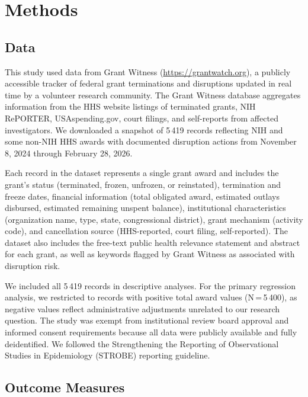 \documentclass[10pt, letterpaper]{article}
\begin{document}
\section*{Methods}

\subsection*{Data}

This study used data from Grant Witness (\url{https://grantwatch.org}), a publicly accessible tracker of federal grant terminations and disruptions updated in real time by a volunteer research community.\cite{grantwitness2025} The Grant Witness database aggregates information from the HHS website listings of terminated grants, NIH RePORTER, USAspending.gov, court filings, and self-reports from affected investigators. We downloaded a snapshot of 5\,419 records reflecting NIH and some non-NIH HHS awards with documented disruption actions from November 8, 2024 through February 28, 2026.

Each record in the dataset represents a single grant award and includes the grant's status (terminated, frozen, unfrozen, or reinstated), termination and freeze dates, financial information (total obligated award, estimated outlays disbursed, estimated remaining unspent balance), institutional characteristics (organization name, type, state, congressional district), grant mechanism (activity code), and cancellation source (HHS-reported, court filing, self-reported). The dataset also includes the free-text public health relevance statement and abstract for each grant, as well as keywords flagged by Grant Witness as associated with disruption risk.

We included all 5\,419 records in descriptive analyses. For the primary regression analysis, we restricted to records with positive total award values (N\,=\,5\,400), as negative values reflect administrative adjustments unrelated to our research question. The study was exempt from institutional review board approval and informed consent requirements because all data were publicly available and fully deidentified. We followed the Strengthening the Reporting of Observational Studies in Epidemiology (STROBE) reporting guideline.

\subsection*{Outcome Measures}
\end{document}
